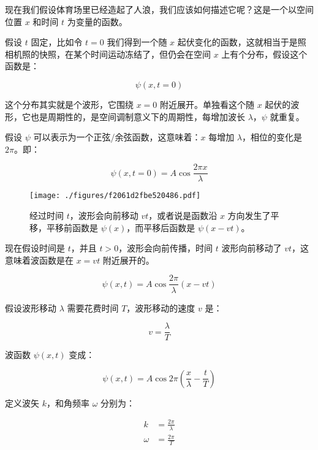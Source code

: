 现在我们假设体育场里已经造起了人浪，我们应该如何描述它呢？这是一个以空间位置 $x$ 和时间 $t$ 为变量的函数。

假设 $t$ 固定，比如令 $t = 0$ 我们得到一个随 $x$ 起伏变化的函数，这就相当于是照相机照的快照，在某个时间运动冻结了，但仍会在空间 $x$ 上有个分布，假设这个函数是：

\begin{equation}
\psi (x, t = 0) 
\end{equation}

这个分布其实就是个波形，它围绕 $x = 0$ 附近展开。单独看这个随 $x$ 起伏的波形，它也是周期性的，是空间调制意义下的周期性，每增加波长 $\lambda$，$\psi$ 就重复。

假设 $\psi$ 可以表示为一个正弦/余弦函数，这意味着：$x$ 每增加 $\lambda$，相位的变化是 $2 \pi$。即：

\begin{equation}
\psi (x, t = 0) = A \cos \frac{2 \pi x}{ \lambda}
\end{equation}

\begin{figure}[ht]
\centering
\texttt{[image: ./figures/f2061d2fbe520486.pdf]}
\caption{经过时间 $t$，波形会向前移动 $vt$，或者说是函数沿 $x$ 方向发生了平移，平移前函数是 $\psi(x)$，而平移后函数是 $\psi(x - vt)$。} \label{fig_AtomId_9}
\end{figure}

现在假设时间是 $t$，并且 $t > 0$，波形会向前传播，时间 $t$ 波形向前移动了 $vt$，这意味着波函数是在 $x = vt$ 附近展开的。

\begin{equation}
\psi(x,t) = A \cos \frac{2 \pi}{\lambda} \left( x - vt \right)
\end{equation}

假设波形移动 $\lambda$ 需要花费时间 $T$，波形移动的速度 $v$ 是：

\begin{equation}
v = \frac{\lambda}{ T }
\end{equation}

波函数 $\psi(x,t)$ 变成：

\begin{equation}
\psi(x, t) = A \cos   2\pi \left(  \frac{x}{\lambda} - \frac{t}{T}   \right)
\end{equation}

定义波矢 $k$，和角频率 $\omega$ 分别为：

\begin{equation}
\begin{aligned}
k &= \frac{2 \pi}{\lambda} \\
\omega &= \frac{2 \pi}{T}
\end{aligned}
\end{equation}

